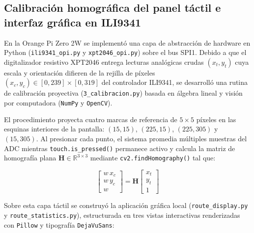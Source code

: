 \documentclass[12pt, letterpaper]{article}
\begin{document}
\subsection*{Calibración homográfica del panel táctil e interfaz gráfica en ILI9341}

En la Orange Pi Zero 2W se implementó una capa de abstracción de hardware en Python (\texttt{ili9341\_opi.py} y \texttt{xpt2046\_opi.py}) sobre el bus SPI1. Debido a que el digitalizador resistivo XPT2046 entrega lecturas analógicas crudas $(x_t, y_t)$ cuya escala y orientación difieren de la rejilla de píxeles $(x_c, y_c) \in [0, 239] \times [0, 319]$ del controlador ILI9341, se desarrolló una rutina de calibración proyectiva (\texttt{3\_calibracion.py}) basada en álgebra lineal y visión por computadora (\texttt{NumPy} y \texttt{OpenCV}).

El procedimiento proyecta cuatro marcas de referencia de $5 \times 5$ píxeles en las esquinas interiores de la pantalla: $(15,15)$, $(225,15)$, $(225,305)$ y $(15,305)$. Al presionar cada punto, el sistema promedia múltiples muestras del ADC mientras \texttt{touch.is\_pressed()} permanece activo y calcula la matriz de homografía plana $\mathbf{H} \in \mathbb{R}^{3 \times 3}$ mediante \texttt{cv2.findHomography()} tal que:

\begin{equation}
    \begin{bmatrix} w \, x_c \\ w \, y_c \\ w \end{bmatrix} = \mathbf{H} \begin{bmatrix} x_t \\ y_t \\ 1 \end{bmatrix}
\end{equation}

Sobre esta capa táctil se construyó la aplicación gráfica local (\texttt{route\_display.py} y \texttt{route\_statistics.py}), estructurada en tres vistas interactivas renderizadas con \texttt{Pillow} y tipografía \texttt{DejaVuSans}:
\end{document}
